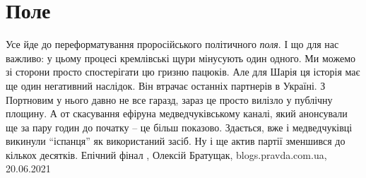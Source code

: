  
 
 
 
 
\chapter{Поле}
\label{sec:slova.pole}

Усе йде до переформатування проросійського політичного \emph{поля}. І що для нас
важливо: у цьому процесі кремлівські щури мінусують один одного. Ми можемо зі
сторони просто спостерігати цю гризню пацюків.  Але для Шарія ця історія має ще
один негативний наслідок. Він втрачає останніх партнерів в Україні. З Портновим
у нього давно не все гаразд, зараз це просто вилізло у публічну площину. А от
скасування ефіруна медведчуківському каналі, який анонсували ще за пару годин
до початку – це більш показово. Здається, вже і медведчуківці викинули
\enquote{іспанця} як використаний засіб. Ну і ще актив партії зменшився до кількох
десятків. Епічний фінал
, Олексій Братущак, blogs.pravda.com.ua, 20.06.2021

